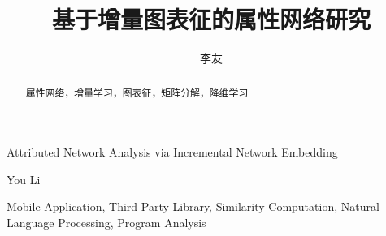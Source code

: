\documentclass{sysuthesis} %
\numberwithin{algorithm}{chapter}
\theoremstyle{plain}
\theoremstyle{definition}
\theoremstyle{definition}
\begin{document}
\title{基于增量图表征的属性网络研究}{}{Attributed Network Analysis via Incremental Network Embedding}{}

\author{李友}{You Li}




\maketitle

\begin{abstract}{属性网络，增量学习，图表征，矩阵分解，降维学习}
  
\end{abstract}

\begin{englishabstract}{Mobile Application, Third-Party Library, Similarity Computation, Natural Language Processing, Program Analysis}
  
\end{englishabstract}

\tableofcontents


\begin{Main} %










%

%

\end{Main} %






\newpage
\printindex %
\end{document}
